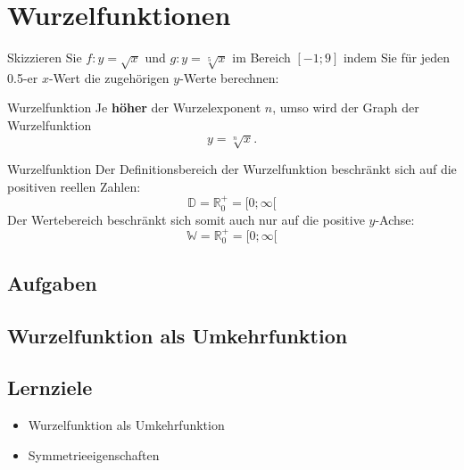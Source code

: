 \section{Wurzelfunktionen}






Skizzieren Sie $f: y = \sqrt{x}$ und $g: y=\sqrt[5]{x}$ im Bereich $[-1; 9]$ indem Sie für jeden 0.5-er $x$-Wert die zugehörigen $y$-Werte berechnen:


\begin{bemerkung}{Wurzelfunktion}{}
 Je \textbf{höher} der Wurzelexponent $n$, umso
  wird der Graph der Wurzelfunktion $$y=\sqrt[n]{x}.$$ 
\end{bemerkung}


\begin{definition}{Wurzelfunktion}{}
  Der Definitionsbereich der Wurzelfunktion beschränkt sich auf die
  positiven reellen Zahlen:
  $$\mathbb{D} = \mathbb{R}_0^{+} = [0;\infty[$$
      Der Wertebereich beschränkt sich somit auch nur auf die positive $y$-Achse:
  $$\mathbb{W} = \mathbb{R}_0^{+} = [0;\infty[$$
      
\end{definition}


\subsection*{Aufgaben}




\newpage

\subsection{Wurzelfunktion als
  Umkehrfunktion}

\subsection*{Lernziele}

\begin{itemize}
\item Wurzelfunktion als Umkehrfunktion
\item Symmetrieeigenschaften
\end{itemize}

